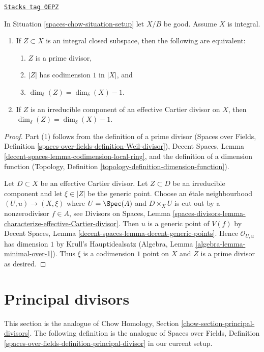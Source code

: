 \begin{lemma}
\label{spaces-chow-lemma-divisor-delta-dimension}
\href{https://stacks.math.columbia.edu/tag/0EPZ}{\texttt{Stacks tag 0EPZ}}

In Situation \ref{spaces-chow-situation-setup} let $X/B$ be good. Assume $X$ is
integral.
\begin{enumerate}
\item If $Z \subset X$ is an integral closed subspace, then
the following are equivalent:
\begin{enumerate}
\item $Z$ is a prime divisor,
\item $|Z|$ has codimension $1$ in $|X|$, and
\item $\dim_\delta(Z) = \dim_\delta(X) - 1$.
\end{enumerate}
\item If $Z$ is an irreducible component of an effective Cartier
divisor on $X$, then $\dim_\delta(Z) = \dim_\delta(X) - 1$.
\end{enumerate}
\end{lemma}

\begin{proof}
Part (1) follows from the definition of a prime divisor
(Spaces over Fields, Definition
\ref{spaces-over-fields-definition-Weil-divisor}),
Decent Spaces, Lemma \ref{decent-spaces-lemma-codimension-local-ring},
and the definition of a dimension function
(Topology, Definition \ref{topology-definition-dimension-function}).

\medskip\noindent
Let $D \subset X$ be an effective Cartier divisor. Let $Z \subset D$
be an irreducible component and let $\xi \in |Z|$ be the generic point.
Choose an \'etale neighbourhood $(U, u) \to (X, \xi)$ where $U = \Spec(A)$
and $D \times_X U$ is cut out by a nonzerodivisor $f \in A$, see
Divisors on Spaces, Lemma
\ref{spaces-divisors-lemma-characterize-effective-Cartier-divisor}.
Then $u$ is a generic point of $V(f)$ by
Decent Spaces, Lemma \ref{decent-spaces-lemma-decent-generic-points}.
Hence $\mathcal{O}_{U, u}$ has dimension $1$ by
Krull's Hauptidealsatz (Algebra, Lemma \ref{algebra-lemma-minimal-over-1}).
Thus $\xi$ is a codimension $1$ point on $X$ and $Z$ is a prime
divisor as desired.
\end{proof}

\section{Principal divisors}
\label{spaces-chow-section-principal-divisors}
This section is the analogue of
Chow Homology, Section \ref{chow-section-principal-divisors}.
The following definition is the analogue of
Spaces over Fields, Definition
\ref{spaces-over-fields-definition-principal-divisor}
in our current setup.

